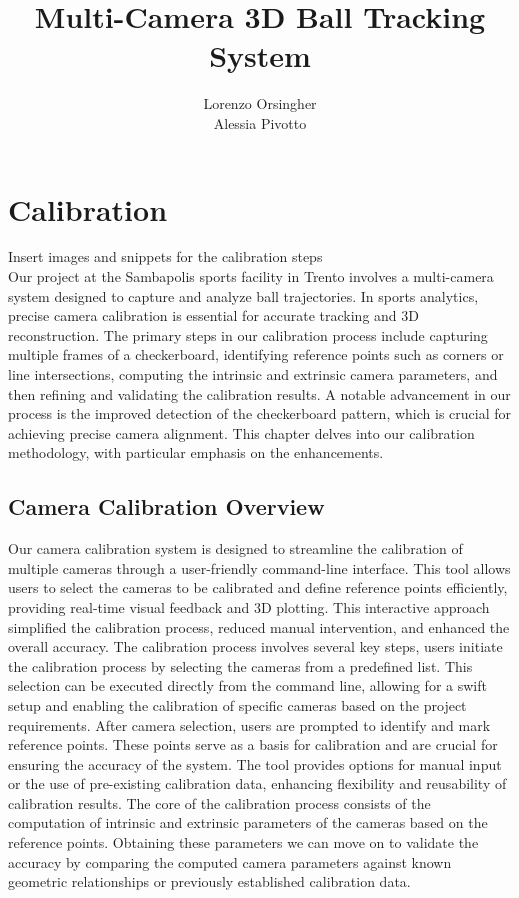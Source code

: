 \documentclass{template}
\title{Multi-Camera 3D Ball Tracking System}
\author{Lorenzo Orsingher\\Alessia Pivotto}
\begin{document}
\chapter{Calibration}\label{ch:in}
Insert images and snippets for the calibration steps\\
Our project at the Sambapolis sports facility in Trento involves a multi-camera system designed to capture and analyze ball trajectories. In sports analytics, precise camera calibration is essential for accurate tracking and 3D reconstruction. The primary steps in our calibration process include capturing multiple frames of a checkerboard, identifying reference points such as corners or line intersections, computing the intrinsic and extrinsic camera parameters, and then refining and validating the calibration results.
A notable advancement in our process is the improved detection of the checkerboard pattern, which is crucial for achieving precise camera alignment. This chapter delves into our calibration methodology, with particular emphasis on the enhancements.

\section{Camera Calibration Overview}
Our camera calibration system is designed to streamline the calibration of multiple cameras through a user-friendly command-line interface. This tool allows users to select the cameras to be calibrated and define reference points efficiently, providing real-time visual feedback and 3D plotting. This interactive approach simplified the calibration process, reduced manual intervention, and enhanced the overall accuracy. 
The calibration process involves several key steps, users initiate the calibration process by selecting the cameras from a predefined list. This selection can be executed directly from the command line, allowing for a swift setup and enabling the calibration of specific cameras based on the project requirements. After camera selection, users are prompted to identify and mark reference points. These points serve as a basis for calibration and are crucial for ensuring the accuracy of the system. The tool provides options for manual input or the use of pre-existing calibration data, enhancing flexibility and reusability of calibration results.
The core of the calibration process consists of the computation of intrinsic and extrinsic parameters of the cameras based on the reference points. Obtaining these parameters we can move on to validate the accuracy by comparing the computed camera parameters against known geometric relationships or previously established calibration data. 
\end{document}
